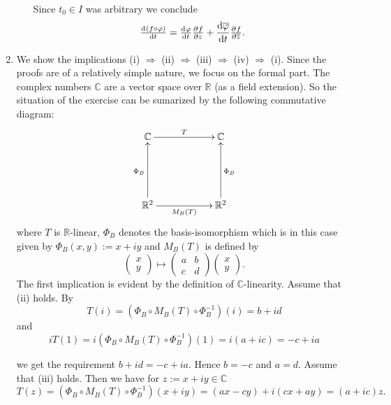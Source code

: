 \begin{enumerate}[label = \textbf{Exercise \arabic*.},wide = 0pt, itemsep=1.5ex]
\begin{enumerate}[label = (\roman*),wide = 0pt, itemsep=1.5ex]
				Since $t_0 \in I$ was arbitrary we conclude
				\begin{equation}
					\od{(f \circ \varphi)}{t} = \od{\varphi}{t}\pd{f}{z} + \frac{\d \overline{\varphi}}{\d t}\pd{f}{\overline{z}}.
				\end{equation}
				\end{enumerate}

	\item We show the implications (i) $\Rightarrow$ (ii) $\Rightarrow$ (iii) $\Rightarrow$ (iv) $\Rightarrow$ (i). Since the proofs are of a relatively simple nature, we focus on the formal part. The complex numbers $\mathbb{C}$ are a vector space over $\mathbb{R}$ (as a field extension). So the situation of the exercise can be sumarized by the following commutative diagram:
		\[
			\xymatrix@=2cm{
				\mathbb{C} \ar[r]^T &\mathbb{C}\\
				\mathbb{R}^2 \ar[u]^{\Phi_B} \ar[r]_{M_B(T)} &\mathbb{R}^2 \ar[u]_{\Phi_B}}
	 	\]
		\noindent where $T$ is $\mathbb{R}$-linear, $\Phi_B$ denotes the basis-isomorphism which is in this case given by $\Phi_B(x,y) := x + iy$ and $M_B(T)$ is defined by
		\begin{equation}
			\begin{pmatrix}
				x\\
				y
			\end{pmatrix} \mapsto
			\begin{pmatrix}
				a & b\\
				c & d
			\end{pmatrix}
			\begin{pmatrix}
				x\\
				y
			\end{pmatrix}.
		\end{equation}
		The first implication is evident by the definition of $\mathbb{C}$-linearity. Assume that (ii) holds. By 
		\begin{equation}
			T(i) = (\Phi_B \circ M_B(T) \circ \Phi_B^{-1})(i) = b + id
		\end{equation}
		\noindent and
		\begin{equation}
			iT(1) = i(\Phi_B \circ M_B(T) \circ \Phi_B^{-1})(1) = i(a + ic) = -c + ia 
		\end{equation}

		\noindent we get the requirement $b + id = -c + ia$. Hence $b = -c$ and $a = d$. Assume that (iii) holds. Then we have for $z := x + iy \in \mathbb{C}$
		\begin{equation}
			T(z) = (\Phi_B \circ M_B(T) \circ \Phi_B^{-1})(x + iy) = (ax - cy) + i(cx + ay) = (a + ic)z.
		\end{equation}


\end{enumerate}
